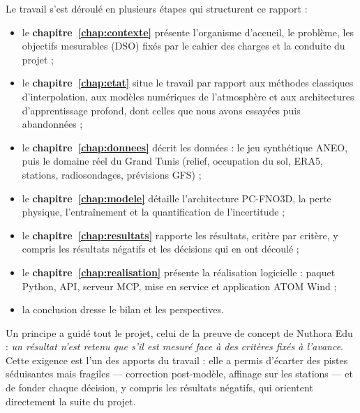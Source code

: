 Le travail s'est déroulé en plusieurs étapes qui structurent ce rapport :
\begin{itemize}
  \item le \textbf{chapitre~\ref{chap:contexte}} présente l'organisme d'accueil, le problème, les
        objectifs mesurables (DSO) fixés par le cahier des charges et la conduite du projet ;
  \item le \textbf{chapitre~\ref{chap:etat}} situe le travail par rapport aux méthodes classiques
        d'interpolation, aux modèles numériques de l'atmosphère et aux architectures d'apprentissage
        profond, dont celles que nous avons essayées puis abandonnées ;
  \item le \textbf{chapitre~\ref{chap:donnees}} décrit les données : le jeu synthétique ANEO, puis
        le domaine réel du Grand Tunis (relief, occupation du sol, ERA5, stations, radiosondages,
        prévisions GFS) ;
  \item le \textbf{chapitre~\ref{chap:modele}} détaille l'architecture PC-FNO3D, la perte physique,
        l'entraînement et la quantification de l'incertitude ;
  \item le \textbf{chapitre~\ref{chap:resultats}} rapporte les résultats, critère par critère, y
        compris les résultats négatifs et les décisions qui en ont découlé ;
  \item le \textbf{chapitre~\ref{chap:realisation}} présente la réalisation logicielle : paquet
        Python, API, serveur MCP, mise en service et application ATOM Wind ;
  \item la conclusion dresse le bilan et les perspectives.
\end{itemize}

Un principe a guidé tout le projet, celui de la preuve de concept de Nuthora Edu : \emph{un
résultat n'est retenu que s'il est mesuré face à des critères fixés à l'avance}. Cette exigence est
l'un des apports du travail : elle a permis d'écarter des pistes séduisantes mais fragiles
--- correction post-modèle, affinage sur les stations --- et de fonder chaque décision, y compris
les résultats négatifs, qui orientent directement la suite du projet.
